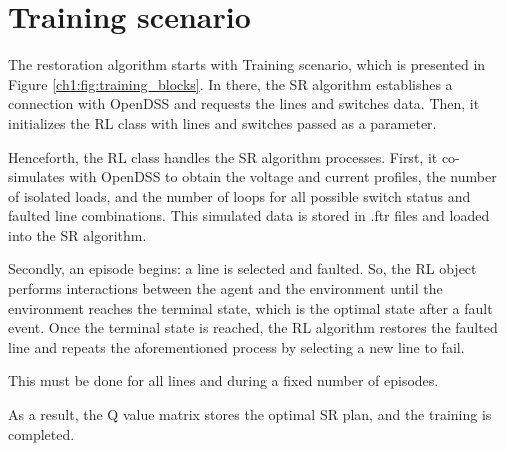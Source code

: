 \section{Training scenario}
\label{ch1:sec:training}


The restoration algorithm starts with Training scenario, which is presented in Figure \ref{ch1:fig:training_blocks}. 
In there, the SR algorithm establishes a connection with OpenDSS and requests the lines and switches data. 
Then, it initializes the RL class with lines and switches passed as a parameter. 

Henceforth, the RL class handles the SR algorithm processes. First, it co-simulates with OpenDSS to obtain the voltage and current profiles, the number of isolated loads, and the number of loops for all possible switch status and faulted line combinations. This simulated data is stored in .ftr files and loaded into the SR algorithm.

Secondly, an episode begins: a line is selected and faulted. So, the RL object performs interactions between the agent and the environment until the environment reaches the terminal state, which is the optimal state after a fault event. 
Once the terminal state is reached, the RL algorithm restores the faulted line and repeats the aforementioned process by selecting a new line to fail. 

This must be done for all lines and during a fixed number of episodes. 

As a result, the Q value matrix stores the optimal SR plan, and the training is completed. 
